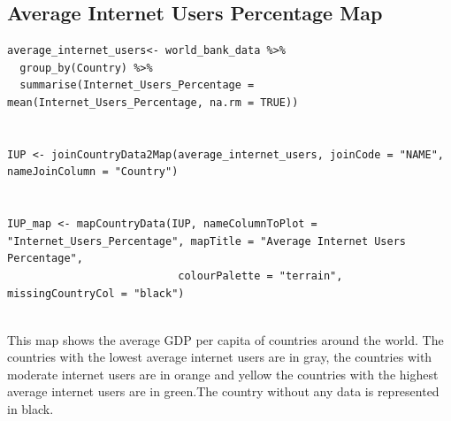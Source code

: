 \documentclass{article}\usepackage[]{graphicx}\usepackage[]{xcolor}
\begin{document}
\subsection{Average Internet Users Percentage Map}
\begin{lstlisting}
average_internet_users<- world_bank_data %>%
  group_by(Country) %>%
  summarise(Internet_Users_Percentage = mean(Internet_Users_Percentage, na.rm = TRUE))


IUP <- joinCountryData2Map(average_internet_users, joinCode = "NAME", nameJoinColumn = "Country")


IUP_map <- mapCountryData(IUP, nameColumnToPlot = "Internet_Users_Percentage", mapTitle = "Average Internet Users Percentage", 
                           colourPalette = "terrain", missingCountryCol = "black")


\end{lstlisting}
This map shows the average GDP per capita of countries around the world. The countries with the lowest average internet users are in gray, the countries with moderate internet users are in orange and yellow  the countries with the highest average internet users are in green.The country without any data is represented in black.
\newpage
\end{document}
